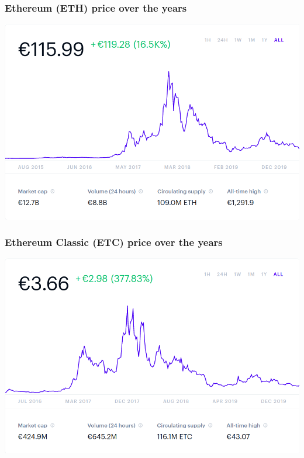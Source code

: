 \documentclass[11pt]{beamer}  %
\begin{document}
\begin{frame}\frametitle{Ethereum (ETH) price over the years}

  \begin{center}
    \includegraphics[scale=0.29,clip=false]{pictures/ethereum.png}
  \end{center}

\end{frame}

\begin{frame}\frametitle{Ethereum Classic (ETC) price over the years}

  \begin{center}
    \includegraphics[scale=0.29,clip=false]{pictures/ethereum-classic.png}
  \end{center}

\end{frame}
\end{document}
